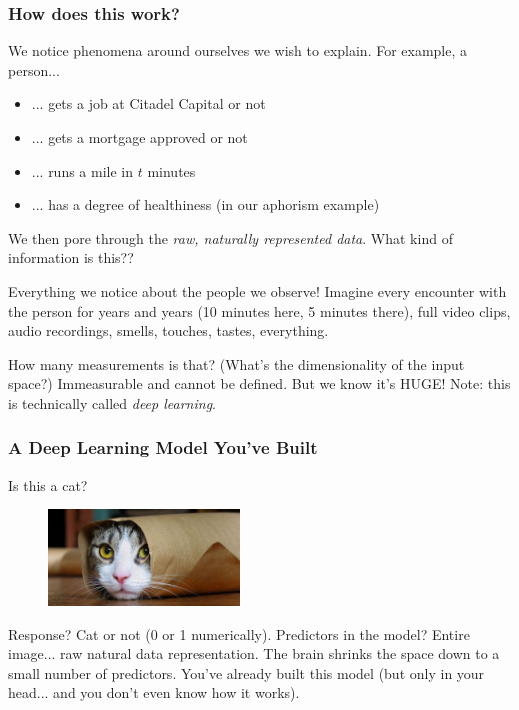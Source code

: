 \documentclass[slides]{beamer} %
\begin{document}
\begin{frame}\frametitle{How does this work?}
\small
We notice phenomena around ourselves we wish to explain. For example, a person...

\begin{itemize}
\item ... gets a job at Citadel Capital or not \pause 
\item ... gets a mortgage approved or not \pause 
\item ... runs a mile in $t$ minutes \pause 
\item ... has a degree of healthiness (in our aphorism example)
\end{itemize}

We then pore through the \textit{raw, naturally represented data}. What kind of information is this??\pause 

Everything we notice about the people we observe! Imagine every encounter with the person for years and years (10 minutes here, 5 minutes there), full video clips, audio recordings, smells, touches, tastes, everything. \pause 

How many measurements is that? (What's the dimensionality of the input space?) Immeasurable and cannot be defined. But we know it's HUGE! Note: this is technically called \emph{deep learning}.

\end{frame}


\begin{frame}\frametitle{A Deep Learning Model You've Built}

Is this a cat?

\begin{figure}
\centering
\includegraphics[width=2in]{cat.jpg}
\end{figure}


Response?  \pause Cat or not (0 or 1 numerically). Predictors in the model?  \pause Entire image... raw natural data representation.  \pause The brain shrinks the space down to a small number of predictors. You've already built this model (but only in your head... and you don't even know how it works). 

	
\end{frame}
\end{document}
